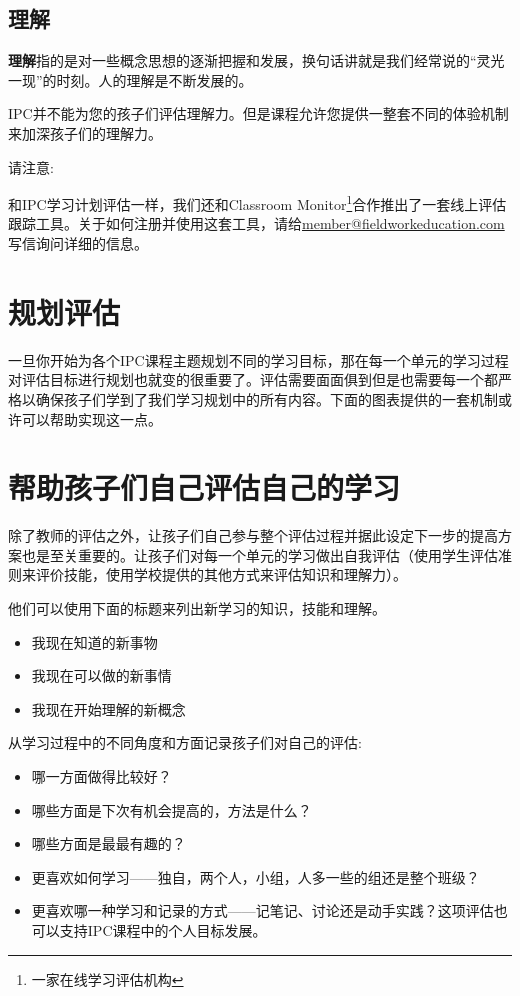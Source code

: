 \subsection{理解}
    \textbf{理解}指的是对一些概念思想的逐渐把握和发展，换句话讲就是我们经常说的“灵光一现”的时刻。人的理解是不断发展的。  \par
    IPC并不能为您的孩子们评估理解力。但是课程允许您提供一整套不同的体验机制来加深孩子们的理解力。\par
    \begin{note}
      请注意: \par
      和IPC学习计划评估一样，我们还和Classroom Monitor\footnote{一家在线学习评估机构}合作推出了一套线上评估跟踪工具。关于如何注册并使用这套工具，请给\underline{member@fieldworkeducation.com}写信询问详细的信息。
    \end{note}


\section{规划评估}
     一旦你开始为各个IPC课程主题规划不同的学习目标，那在每一个单元的学习过程对评估目标进行规划也就变的很重要了。评估需要面面俱到但是也需要每一个都严格以确保孩子们学到了我们学习规划中的所有内容。下面的图表提供的一套机制或许可以帮助实现这一点。


\section{帮助孩子们自己评估自己的学习}
     除了教师的评估之外，让孩子们自己参与整个评估过程并据此设定下一步的提高方案也是至关重要的。让孩子们对每一个单元的学习做出自我评估（使用学生评估准则来评价技能，使用学校提供的其他方式来评估知识和理解力）。  \par
     他们可以使用下面的标题来列出新学习的知识，技能和理解。
     \begin{itemize}
       \item 我现在知道的新事物
       \item 我现在可以做的新事情
       \item 我现在开始理解的新概念
     \end{itemize}   \par
     从学习过程中的不同角度和方面记录孩子们对自己的评估:
     \begin{itemize}
       \item 哪一方面做得比较好？
       \item 哪些方面是下次有机会提高的，方法是什么？
       \item 哪些方面是最最有趣的？ 
       \item 更喜欢如何学习——独自，两个人，小组，人多一些的组还是整个班级？
       \item 更喜欢哪一种学习和记录的方式——记笔记、讨论还是动手实践？这项评估也可以支持IPC课程中的个人目标发展。
     \end{itemize}  \par
    

